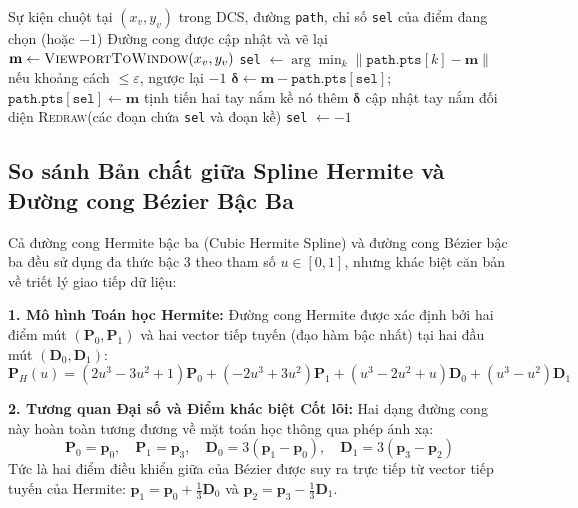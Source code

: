 \begin{algorithm}[H]
\caption{Xử lý kéo một điểm điều khiển trong giao diện Bézier bậc 3}
\label{alg:w5_ui}
\begin{algorithmic}[1]
\Require Sự kiện chuột tại $(x_v, y_v)$ trong DCS, đường \texttt{path}, chỉ số \texttt{sel} của điểm đang chọn (hoặc $-1$)
\Ensure Đường cong được cập nhật và vẽ lại
\State $\mathbf{m} \gets \textsc{ViewportToWindow}(x_v, y_v)$
    \State \texttt{sel} $\gets \arg\min_k \|\texttt{path.pts}[k] - \mathbf{m}\|$ nếu khoảng cách $\le \varepsilon$, ngược lại $-1$
    \State $\boldsymbol{\delta} \gets \mathbf{m} - \texttt{path.pts}[\texttt{sel}]$; \quad $\texttt{path.pts}[\texttt{sel}] \gets \mathbf{m}$
     tịnh tiến hai tay nắm kề nó thêm $\boldsymbol{\delta}$
     cập nhật tay nắm đối diện
    \EndIf
    \State \textsc{Redraw}(các đoạn chứa \texttt{sel} và đoạn kề)
    \State \texttt{sel} $\gets -1$
\EndIf
\end{algorithmic}
\end{algorithm}

\subsection{So sánh Bản chất giữa Spline Hermite và Đường cong Bézier Bậc Ba}

Cả đường cong Hermite bậc ba (Cubic Hermite Spline) và đường cong Bézier bậc ba đều sử dụng đa thức bậc 3 theo tham số $u \in [0, 1]$, nhưng khác biệt căn bản về triết lý giao tiếp dữ liệu:

\textbf{1. Mô hình Toán học Hermite:}
Đường cong Hermite được xác định bởi hai điểm mút $(\mathbf{P}_0, \mathbf{P}_1)$ và hai vector tiếp tuyến (đạo hàm bậc nhất) tại hai đầu mút $(\mathbf{D}_0, \mathbf{D}_1)$:
\begin{equation}
\mathbf{P}_H(u) = (2u^3 - 3u^2 + 1)\mathbf{P}_0 + (-2u^3 + 3u^2)\mathbf{P}_1 + (u^3 - 2u^2 + u)\mathbf{D}_0 + (u^3 - u^2)\mathbf{D}_1
\end{equation}

\textbf{2. Tương quan Đại số và Điểm khác biệt Cốt lõi:}
Hai dạng đường cong này hoàn toàn tương đương về mặt toán học thông qua phép ánh xạ:
\begin{equation}
\mathbf{P}_0 = \mathbf{p}_0, \quad \mathbf{P}_1 = \mathbf{p}_3, \quad \mathbf{D}_0 = 3(\mathbf{p}_1 - \mathbf{p}_0), \quad \mathbf{D}_1 = 3(\mathbf{p}_3 - \mathbf{p}_2)
\end{equation}
Tức là hai điểm điều khiển giữa của Bézier được suy ra trực tiếp từ vector tiếp tuyến của Hermite: $\mathbf{p}_1 = \mathbf{p}_0 + \frac{1}{3}\mathbf{D}_0$ và $\mathbf{p}_2 = \mathbf{p}_3 - \frac{1}{3}\mathbf{D}_1$.

